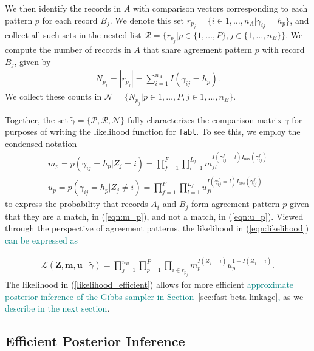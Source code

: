 \documentclass[ba]{imsart}
\begin{document}
We then identify the records in $A$ with comparison vectors corresponding to each pattern $p$ for each record $B_j$. We denote this set $r_{p_j} = \{i \in 1, \dots, n_A | \gamma_{ij} = h_p\}$, and collect all such sets in the nested list $\mathcal{R} = \{r_{p_j} | p \in \{1, \ldots, P\}, j \in \{1, \ldots, n_B\} \}$. We compute the number of records in $A$ that share agreement pattern $p$ with record $B_j$, given by
\begin{align}\label{eqn:N}
N_{p_j} = |r_{p_j}| = \sum_{i=1}^{n_A} I(\gamma_{ij} = h_p).
\end{align}
We collect these counts in $\mathcal{N} = \{N_{p_j} |p \in 1, \ldots, P, j \in 1, \ldots, n_B \}$. 

Together, the set $\tilde{\gamma} = \{\mathcal{P}, \mathcal{R}, \mathcal{N}\}$ fully characterizes the comparison matrix $\gamma$ for purposes of writing the likelihood function for \texttt{fabl}. To see this, we employ the condensed notation
\begin{subequations}
	\begin{align}
		m_p =  p(\gamma_{ij} = h_p|Z_j = i) = \prod_{f=1}^{F}\prod_{l=1}^{L_f} m_{fl}^{I(\gamma_{ij}^f = l)I_{obs}(\gamma_{ij}^f)}\label{eqn:m_p} \\
		u_p =  p(\gamma_{ij} = h_p|Z_j \neq i) = \prod_{f=1}^{F}\prod_{l=1}^{L_f} u_{fl}^{I(\gamma_{ij}^f = l)I_{obs}(\gamma_{ij}^f)}\label{eqn:u_p}
	\end{align}
\end{subequations}
to express the probability that records $A_i$ and $B_j$ form agreement pattern $p$ given that they are a match, in (\ref{eqn:m_p}), and not a match, in (\ref{eqn:u_p}). Viewed through the perspective of agreement patterns, the likelihood in (\ref{eqn:likelihood}) \textcolor{teal}{can be expressed as}

\begin{align}\label{likelihood_efficient}
	\mathcal{L}(\bm{Z}, \bm{m}, \bm{u} \mid \tilde{\gamma}) = \prod_{j=1}^{n_B}\prod_{p=1}^P \prod_{i \in r_{p_j}} m_p^{I(Z_j = i)}u_p^{1 - I(Z_j = i)}. 
\end{align}
The likelihood in (\ref{likelihood_efficient}) allows for more
efficient \textcolor{teal}{approximate posterior inference of the Gibbs sampler in Section~\ref{sec:fast-beta-linkage},}  as we \textcolor{teal}{describe in the next section}.


\hypertarget{efficient-posterior}{%
	\subsection{Efficient Posterior Inference }\label{efficient-posterior}}
\end{document}
